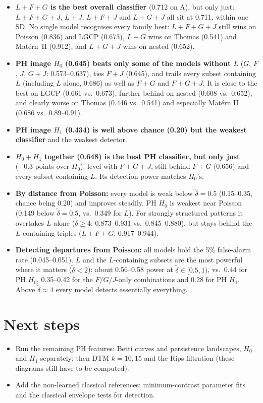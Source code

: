 \documentclass[10pt,a4paper]{article}
\newcommand{\dtil}{\tilde\delta}
\begin{document}
\begin{itemize}
  \item \textbf{$L{+}F{+}G$ is the best overall classifier} (0.712 on A), but only just: $L{+}F{+}G{+}J$, $L{+}J$, $L{+}F{+}J$ and $L{+}G{+}J$ all sit at 0.711, within one SD. No single model recognises every family best: $L{+}F{+}G{+}J$ still wins on Poisson (0.836) and LGCP (0.673), $L{+}G$ wins on Thomas (0.541) and Mat\'ern~II (0.912), and $L{+}G{+}J$ wins on nested (0.652).
  \item \textbf{PH image $H_0$ (0.645) beats only some of the models without $L$} ($G$, $F$, $J$, $G{+}J$: 0.573--0.637), ties $F{+}J$ (0.645), and trails every subset containing $L$ (including $L$ alone, 0.686) as well as $F{+}G$ and $F{+}G{+}J$. It is close to the best on LGCP (0.661 vs.\ 0.673), further behind on nested (0.608 vs.\ 0.652), and clearly worse on Thomas (0.446 vs.\ 0.541) and especially Mat\'ern II (0.686 vs.\ 0.89--0.91).
  \item \textbf{PH image $H_1$ (0.434) is well above chance (0.20) but the weakest classifier} and the weakest detector.
  \item \textbf{$H_0{+}H_1$ together (0.648) is the best PH classifier, but only just} (+0.3 points over $H_0$): level with $F{+}G{+}J$, still behind $F{+}G$ (0.656) and every subset containing $L$. Its detection power matches $H_0$'s.
  \item \textbf{By distance from Poisson:} every model is weak below $\dtil = 0.5$ (0.15--0.35, chance being 0.20) and improves steadily. PH $H_0$ is weakest near Poisson (0.149 below $\dtil=0.5$, vs.\ 0.349 for $L$). For strongly structured patterns it overtakes $L$ alone ($\dtil \ge 4$: 0.873--0.931 vs.\ 0.845--0.880), but stays behind the $L$-containing triples ($L{+}F{+}G$: 0.917--0.944).
  \item \textbf{Detecting departures from Poisson:} all models hold the 5\% false-alarm rate (0.045--0.051). $L$ and the $L$-containing subsets are the most powerful where it matters ($\dtil < 2$): about 0.56--0.58 power at $\dtil\in[0.5,1)$, vs.\ 0.44 for PH $H_0$, 0.35--0.42 for the $F/G/J$-only combinations and 0.28 for PH $H_1$. Above $\dtil \approx 4$ every model detects essentially everything.
\end{itemize}

\section{Next steps}

\begin{itemize}
  \item Run the remaining PH features: Betti curves and persistence landscapes, $H_0$ and $H_1$ separately; then DTM $k=10, 15$ and the Rips filtration (these diagrams still have to be computed).
  \item Add the non-learned classical references: minimum-contrast parameter fits and the classical envelope tests for detection.
\end{itemize}
\end{document}
